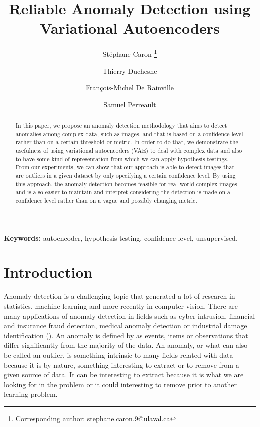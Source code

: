 \documentclass{article}
\begin{document}
\title{\bf Reliable Anomaly Detection using Variational Autoencoders}


\author[1]{St{\'e}phane Caron \thanks{Corresponding author: stephane.caron.9@ulaval.ca}}
\author[1]{Thierry Duchesne}
\author[2]{Fran\c{c}ois-Michel De Rainville}
\author[1]{Samuel Perreault}



\maketitle


\begin{abstract}
	In this paper, we propose an anomaly detection methodology that aims to detect anomalies among complex data, such as images, and that is based on a confidence level rather than on a certain threshold or metric. In order to do that, we demonstrate the usefulness of using variational autoencoders (VAE) to deal with complex data and also to have some kind of representation from which we can apply hypothesis testings. From our experiments, we can show that our approach is able to detect images that are outliers in a given dataset by only specifying a certain confidence level. By using this approach, the anomaly detection becomes feasible for real-world complex images and is also easier to maintain and interpret considering the detection is made on a confidence level rather than on a vague and possibly changing metric.
\end{abstract}

\textbf{Keywords:} autoencoder, hypothesis testing, confidence level, unsupervised.


\newpage

\section{Introduction}

Anomaly detection is a challenging topic that generated a lot of research in statistics, machine learning and more recently in computer vision. There are many applications of anomaly detection in fields such as cyber-intrusion, financial and insurance fraud detection, medical anomaly detection or industrial damage identification (\cite{Chandola07anomalydetection:}). An anomaly is defined by \cite{Zimek2017} as events, items or observations that differ significantly from the majority of the data. An anomaly, or what can also be called an outlier, is something intrinsic to many fields related with data because it is by nature, something interesting to extract or to remove from a given source of data.  It can be interesting to extract because it is what we are looking for in the problem or it could interesting to remove prior to another learning problem. \newline
\end{document}
